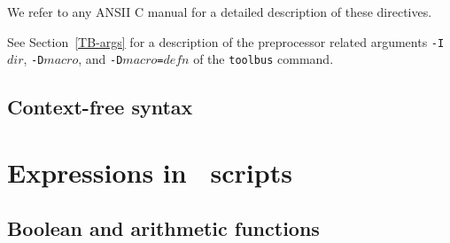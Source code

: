 \documentclass[twoside]{article} %
\begin{document}
\noindent We refer to any ANSII C manual for a detailed description of these
directives. 

See Section~\ref{TB-args} for a description
of the preprocessor related arguments {\tt -I$dir$}, {\tt -D$macro$}, and
{\tt -D$macro$=$defn$} of the {\tt toolbus} command.

\subsection{Context-free syntax}

  
\newpage
\section{\label{AppExpr}Expressions in \T\ scripts}

\subsection{Boolean and arithmetic functions}
\end{document}
